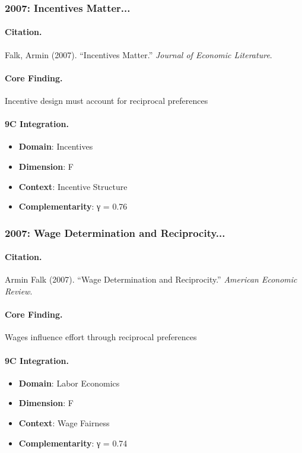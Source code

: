 \subsubsection{2007: Incentives Matter...}

\paragraph{Citation.}
Falk, Armin (2007). ``Incentives Matter.''
\textit{Journal of Economic Literature}.

\paragraph{Core Finding.}
Incentive design must account for reciprocal preferences

\paragraph{9C Integration.}
\begin{itemize}[nosep]
  \item \textbf{Domain}: Incentives
  \item \textbf{Dimension}: F
  \item \textbf{Context}: Incentive Structure
  \item \textbf{Complementarity}: γ = 0.76
\end{itemize}


\subsubsection{2007: Wage Determination and Reciprocity...}

\paragraph{Citation.}
Armin Falk (2007). ``Wage Determination and Reciprocity.''
\textit{American Economic Review}.

\paragraph{Core Finding.}
Wages influence effort through reciprocal preferences

\paragraph{9C Integration.}
\begin{itemize}[nosep]
  \item \textbf{Domain}: Labor Economics
  \item \textbf{Dimension}: F
  \item \textbf{Context}: Wage Fairness
  \item \textbf{Complementarity}: γ = 0.74
\end{itemize}


